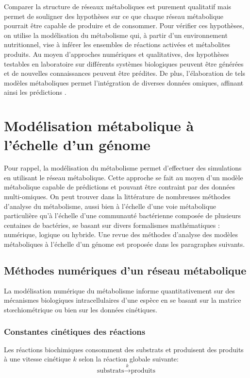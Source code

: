 \documentclass[../main.tex]{subfiles}
\begin{document}
Comparer la structure de réseaux métaboliques est purement qualitatif mais permet de souligner des hypothèses sur ce que chaque réseau métabolique pourrait être capable de produire et de consommer. Pour vérifier ces hypothèses, on utilise la modélisation du métabolisme qui, à partir d'un environnement nutritionnel, vise à inférer les ensembles de réactions activées et métabolites produits. Au moyen d'approches numériques et qualitatives, des hypothèses testables en laboratoire sur différents systèmes biologiques peuvent être générées et de nouvelles connaissances peuvent être prédites. De plus, l'élaboration de tels modèles métaboliques permet l'intégration de diverses données omiques, affinant ainsi les prédictions \citep{Passi2022}.


\newpage

\section{Modélisation métabolique à l'échelle d'un génome}
Pour rappel, la modélisation du métabolisme permet d'effectuer des simulations en utilisant le réseau métabolique. Cette approche se fait au moyen d'un modèle métabolique capable de prédictions et pouvant être contraint par des données multi-omiques. On peut trouver dans la littérature de nombreuses méthodes d'analyse du métabolisme, aussi bien à l'échelle d'une voie métabolique particulière qu'à l'échelle d'une communauté bactérienne composée de plusieurs centaines de bactéries, se basant sur divers formalismes mathématiques : numérique, logique ou hybride. Une revue des méthodes d'analyse des modèles métaboliques à l'échelle d'un génome est proposée dans les paragraphes suivants. 

\subsection{Méthodes numériques d'un réseau métabolique}
La modélisation numérique du métabolisme informe quantitativement sur des mécanismes biologiques intracellulaires d'une espèce en se basant sur la matrice st\oe{}chiométrique ou bien sur les données cinétiques. 


\subsubsection{Constantes cinétiques des réactions}
Les réactions biochimiques consomment des substrats et produisent des produits à une vitesse cinétique $k$ selon la réaction globale suivante:
\[
\text{substrats} \overset{k}{\rightarrow} \text{produits} 
\]
\end{document}
